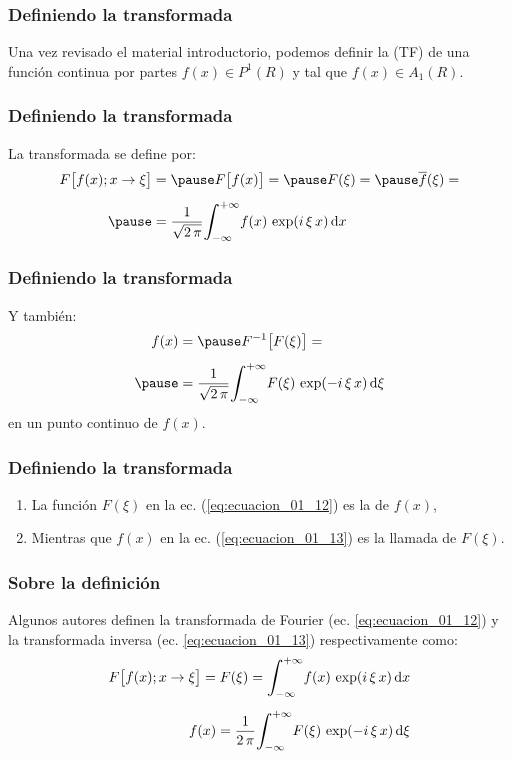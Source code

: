 \begin{frame}
\frametitle{Definiendo la transformada}
Una vez revisado el material introductorio, \pause podemos definir la  (TF) de una función continua por partes $f (x) \in P^{1} (R)$ y tal que $f (x) \in A_{1} (R)$.
\end{frame}
\begin{frame}
\frametitle{Definiendo la transformada}
La transformada se define por:
\pause
\begin{eqnarray}
\begin{aligned}[b]
F \big[ f (x); x \to \xi \big] &= \pause F \big[ f (x) \big] = \pause F (\xi) = \pause \overline{f} (\xi) = \\[0.5em] \pause
&= \dfrac{1}{\sqrt{2 \, \pi}} \scaleint{6ex}_{\bs -\infty}^{+\infty} f (x) \, \exp(i \, \xi \, x) \dd{x}
\end{aligned}
\label{eq:ecuacion_01_12}
\end{eqnarray}
\end{frame}
\begin{frame}
\frametitle{Definiendo la transformada}
Y también:
\pause
\begin{eqnarray}
\begin{aligned}[b]
f (x) &= \pause F^{-1} \big[ F (\xi) \big] = \\[0.5em] \pause
&= \dfrac{1}{\sqrt{2 \, \pi}} \scaleint{6ex}_{\bs -\infty}^{+\infty} F (\xi) \, \exp(-i \, \xi \, x) \dd{\xi}
\label{eq:ecuacion_01_13}
\end{aligned}
\end{eqnarray}
en un punto continuo de $f (x)$.
\end{frame}
\begin{frame}
\frametitle{Definiendo la transformada}
\begin{enumerate}[<+->]
\item La función $F (\xi)$ en la ec. (\ref{eq:ecuacion_01_12}) es la  de $f (x)$,
\item Mientras que $f (x)$ en la ec. (\ref{eq:ecuacion_01_13}) es la llamada  de $F (\xi)$.
\end{enumerate}
\end{frame}
\begin{frame}
\frametitle{Sobre la definición}
Algunos autores definen la transformada de Fourier  (ec. \ref{eq:ecuacion_01_12}) y la transformada inversa (ec. \ref{eq:ecuacion_01_13}) respectivamente como:
\pause
\begin{align}
F \big[ f (x); x \to \xi \big] = F (\xi) = \scaleint{6ex}_{\bs -\infty}^{+\infty} f (x) \, \exp(i \, \xi \, x) \dd{x} \label{eq:ecuacion_01_14} \\[0.5em]
f (x) = \dfrac{1}{2 \, \pi} \scaleint{6ex}_{\bs -\infty}^{+\infty} F (\xi) \, \exp(-i \, \xi \, x) \dd{\xi}
\label{eq:ecuacion_01_15}
\end{align}
\end{frame}
